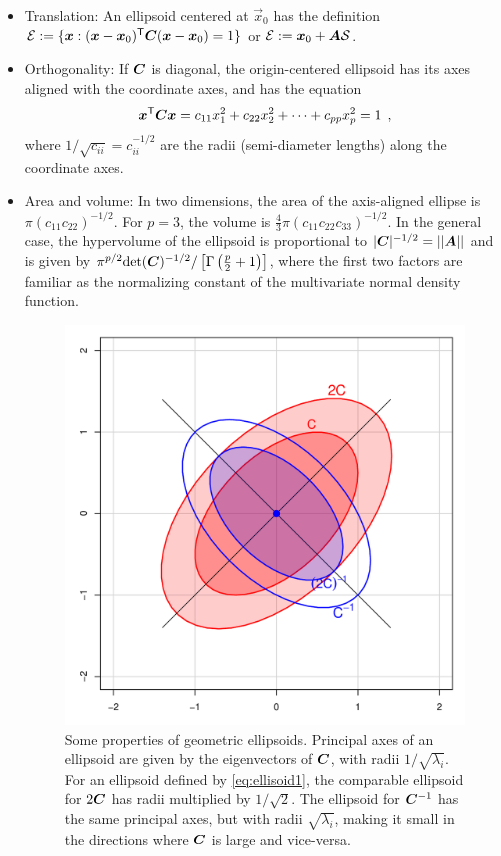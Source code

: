 \begin{itemize}
 \item Translation: An ellipsoid centered at $\vec{x}_0$ has the definition $\mathcal{E} := \{ \bm{x}: (\bm{x}-\bm{x}_0)^\mathsf{T} \bm{C} (\bm{x}-\bm{x}_0) =1
 \}$ or $\mathcal{E} := \bm{x}_0 +\bm{A} \mathcal{S}$.

 \item Orthogonality: If $\bm{C}$ is diagonal, the origin-centered ellipsoid has its axes aligned with the coordinate axes, and
has the equation
\begin{equation}\label{eq:ellisoid2}
 \bm{x}^\mathsf{T} \bm{C} \bm{x} = c_{11} x_1^2 + c_{22} x_2^2 + \cdots + c_{pp} x_p^2 =1 \:\: ,
\end{equation}
where $1/\sqrt{c_{ii}} = c_{ii}^{-1/2}$ are the radii (semi-diameter lengths) along the coordinate axes.

 \item Area and volume: In two dimensions, the area of the axis-aligned ellipse is $\pi (c_{11} c_{22})^{-1/2}$.
 For $p=3$, the volume is $\frac{4}{3}\pi (c_{11} c_{22} c_{33})^{-1/2}$.
 In the general case, the hypervolume of the ellipsoid is proportional to $|\bm{C}|^{-1/2}=||\bm{A}||$
 and is given by $\pi^{p/2} \mathrm{det} (\bm{C})^{-1/2} / \left[  \Gamma\left(\frac{p}{2}+1\right) \right]$,
 where the first two factors are familiar as the normalizing constant of the multivariate normal 
 density function.

\begin{figure}[tb]
  \centering
  \includegraphics[width=.5\textwidth,clip]{fig/inverse}
  \caption{Some properties of geometric ellipsoids. Principal axes of an ellipsoid are given by the eigenvectors of
  $\bm{C}$, with radii $1/\sqrt{\lambda_i}$.  For an ellipsoid defined by \eqref{eq:ellisoid1},
  the comparable ellipsoid for $2\bm{C}$ has radii multiplied by $1/\sqrt{2}$.
  The ellipsoid for $\bm{C}^{-1}$ has the same principal axes, but with radii $\sqrt{\lambda_i}$, making it
  small in the directions where $\bm{C}$ is large and vice-versa.
  } \label{fig:inverse}
\end{figure}


\end{itemize}

